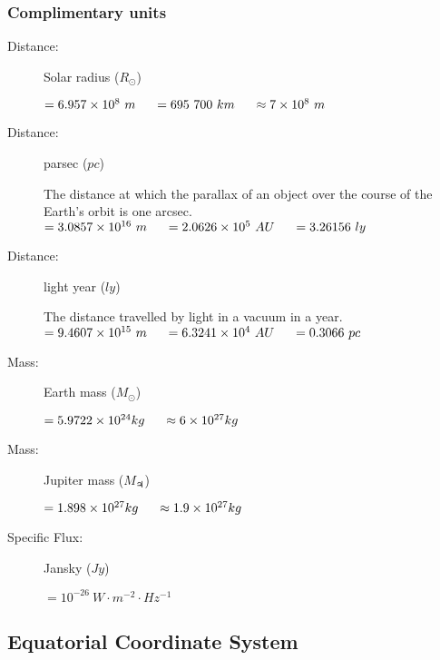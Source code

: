 \subsubsection{Complimentary units}

\begin{description}
\item[Distance:] Solar radius ($R_\odot$)
\begin{itemize}
\items $=6.957 \times 10^8\ m \tab[0.5cm]= 695\ 700\ km \tab[0.5cm] \approx 7 \times 10^8\ m$	
\end{itemize}

\item[Distance:] parsec ($pc$)
\begin{itemize}
\items The distance at which the parallax of an object over the course of the Earth's orbit is one arcsec.
\items $= 3.0857 \times 10^{16}\ m \tab[0.5cm]= 2.0626 \times 10^5\ AU \tab[0.5cm]= 3.26156\ ly$
\end{itemize}

\item[Distance:] light year ($ly$)
\begin{itemize}
\items The distance travelled by light in a vacuum in a year.
\items $= 9.4607 \times 10^{15}\ m \tab[0.5cm] = 6.3241 \times 10^4\ AU \tab[0.5cm]= 0.3066\ pc$
\end{itemize}

\item[Mass:] Earth mass ($M_\odot$)
\begin{itemize}
\items $= 5.9722 \times 10^{24} kg \tab[0.5cm] \approx 6 \times 10^{27} kg $
\end{itemize}

\item[Mass:] Jupiter mass ($M_{\jupiter}$)
\begin{itemize}
\items $= 1.898 \times 10^{27} kg \tab[0.5cm] \approx 1.9 \times 10^{27} kg $
\end{itemize}
                
\item[Specific Flux:] Jansky ($Jy$)
\begin{itemize}
\items $= 10^{-26}\ W\cdot m^{-2} \cdot Hz^{-1}$
\end{itemize}
\end{description}

\subsection{Equatorial Coordinate System}

